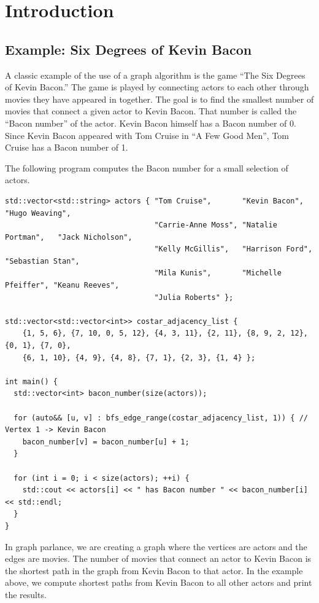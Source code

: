 
\chapter{Introduction}
\label{ch:introduction}


\section{Example: Six Degrees of Kevin Bacon}
\label{sec:bacon}

A classic example of the use of a graph algorithm is the game ``The Six Degrees of Kevin Bacon.''
The game is played by connecting actors to each other through movies they have appeared in together.
The goal is to find the smallest number of movies that connect a given actor to Kevin Bacon.
That number is called the ``Bacon number'' of the actor. Kevin Bacon himself has a Bacon number of 0.
Since Kevin Bacon appeared with Tom Cruise in ``A Few Good Men'', Tom Cruise has a Bacon number of 1.

The following program computes the Bacon number for a small selection of actors.
  {\small
\begin{lstlisting}
std::vector<std::string> actors { "Tom Cruise",       "Kevin Bacon",       "Hugo Weaving",
                                  "Carrie-Anne Moss", "Natalie Portman",   "Jack Nicholson",
                                  "Kelly McGillis",   "Harrison Ford",     "Sebastian Stan",
                                  "Mila Kunis",       "Michelle Pfeiffer", "Keanu Reeves",
                                  "Julia Roberts" };

std::vector<std::vector<int>> costar_adjacency_list {
    {1, 5, 6}, {7, 10, 0, 5, 12}, {4, 3, 11}, {2, 11}, {8, 9, 2, 12}, {0, 1}, {7, 0},
    {6, 1, 10}, {4, 9}, {4, 8}, {7, 1}, {2, 3}, {1, 4} };

int main() {
  std::vector<int> bacon_number(size(actors));

  for (auto&& [u, v] : bfs_edge_range(costar_adjacency_list, 1)) { // Vertex 1 -> Kevin Bacon
    bacon_number[v] = bacon_number[u] + 1;
  }

  for (int i = 0; i < size(actors); ++i) {
    std::cout << actors[i] << " has Bacon number " << bacon_number[i] << std::endl;
  }
}
\end{lstlisting}
}

In graph parlance, we are creating a graph where the vertices are actors and the edges are movies.
The number of movies that connect an actor to Kevin Bacon is the shortest path in the graph
from Kevin Bacon to that actor. In the example above, we compute shortest paths from Kevin
Bacon to all other actors and print the results.


